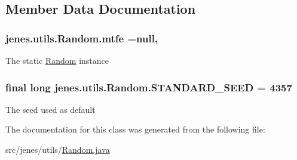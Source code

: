 \subsection{Member Data Documentation}
\hypertarget{classjenes_1_1utils_1_1_random_a4d07f44b9a2f1bc18feb0059dd70b79a}{
\subsubsection[{mtfe}]{ jenes.\-utils.\-Random.\-mtfe =null\hspace{0.3cm}{\ttfamily [static]}, {\ttfamily [private]}}}\label{classjenes_1_1utils_1_1_random_a4d07f44b9a2f1bc18feb0059dd70b79a}
The static \hyperlink{classjenes_1_1utils_1_1_random}{Random} instance \hypertarget{classjenes_1_1utils_1_1_random_aee05c4e6476472dc9dc02d2fd94061b5}{
\subsubsection[{S\-T\-A\-N\-D\-A\-R\-D\-\_\-\-S\-E\-E\-D}]{\setlength{\rightskip}{0pt plus 5cm}final long jenes.\-utils.\-Random.\-S\-T\-A\-N\-D\-A\-R\-D\-\_\-\-S\-E\-E\-D = 4357\hspace{0.3cm}{\ttfamily [static]}}}\label{classjenes_1_1utils_1_1_random_aee05c4e6476472dc9dc02d2fd94061b5}
The seed used as default 

The documentation for this class was generated from the following file\-:\begin{DoxyCompactItemize}
\item 
src/jenes/utils/\hyperlink{_random_8java}{Random.\-java}\end{DoxyCompactItemize}
